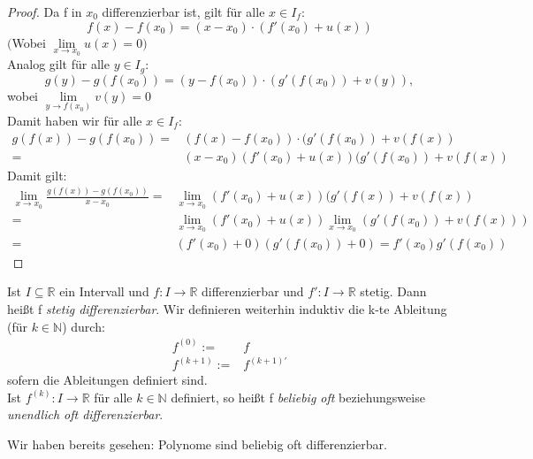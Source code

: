 \begin{proof}	
	Da f in $x_0$ differenzierbar ist, gilt für alle 
	$x \in I_f$:
	\begin{equation*}
		f(x) -f(x_0) = (x-x_0) \cdot(f'(x_0) + u(x))
	\end{equation*}
	$($Wobei $\lim\limits_{x \rightarrow x_0}{u(x) = 0})$ \\
	Analog gilt für alle $y \in I_g$:
	\begin{equation*}
		g(y) -g(f(x_0)) = (y-f(x_0)) \cdot (g'(f(x_0)) + v(y)),
	\end{equation*}		
	wobei $\lim\limits_{y \rightarrow f(x_0)}{v(y) = 0}$ \\
	Damit haben wir für alle $x \in I_f$:
	\begin{align*}
	g(f(x)) - g(f(x_0)) = & (f(x)-f(x_0)) \cdot (g'(f(x_0)) + v(f(x)) \\
	= & (x-x_0)(f'(x_0) + u(x)) (g'(f(x_0)) + v(f(x))
	\end{align*}
	Damit gilt:
	\begin{align*}
	\lim\limits_{x \rightarrow x_0}
	{\frac{g(f(x))-g(f(x_0))}{x-x_0} } 
	= & \lim\limits_{x \rightarrow x_0}{(f'(x_0) + u(x)) (g'(f(x)) + v(f(x))} \\
	= & \lim\limits_{x \rightarrow x_0}{(f'(x_0) + u(x))} 
	\lim\limits_{x \rightarrow x_0}{(g'(f(x_0)) + v(f(x)))} \\
	= & (f'(x_0) + 0) (g'(f(x_0)) + 0)
	= f'(x_0) g'(f(x_0))
	\end{align*}
\end{proof}

\begin{Definition}{
	Ist $I \subseteq \mathbb{R}$ ein Intervall und 
	$f: I \rightarrow \mathbb{R}$ differenzierbar und $f':I \rightarrow \mathbb{R}$
	stetig. Dann heißt f \emph{stetig differenzierbar}. 
	Wir definieren weiterhin induktiv die 
	k-te Ableitung (für $k \in \mathbb{N}$) durch:
	\begin{align*}
		f^{(0)} := & f \\
		f^{(k+1)} := & f^{(k+1)'}
	\end{align*}
	sofern die Ableitungen definiert sind.\\
	Ist $f^{(k)}: I \rightarrow \mathbb{R}$ für alle $k \in \mathbb{N}$ definiert, 
	so heißt f \emph{beliebig oft} beziehungsweise \emph{unendlich oft differenzierbar}.
}\end{Definition}

\begin{Bemerkung}{Wir haben bereits gesehen: Polynome sind beliebig oft
	 differenzierbar.
}\end{Bemerkung}
